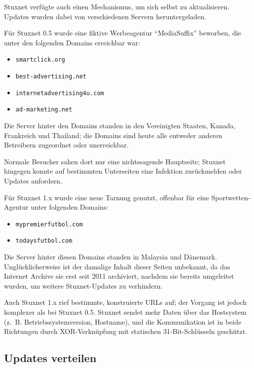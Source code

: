 \documentclass[a4paper]{article}
\begin{document}
Stuxnet verfügte auch einen Mechanismus, um sich selbst zu aktualisieren.
Updates wurden dabei von verschiedenen Servern heruntergeladen.

Für Stuxnet 0.5 wurde eine fiktive Werbeagentur ``MediaSuffix'' beworben, die unter den folgenden Domains erreichbar war:

\begin{itemize}
\item \texttt{smartclick.org}
\item \texttt{best-advertising.net}
\item \texttt{internetadvertising4u.com}
\item \texttt{ad-marketing.net}
\end{itemize}

Die Server hinter den Domains standen in den Vereinigten Staaten, Kanada, Frankreich und Thailand; %
die Domains sind heute alle entweder anderen Betreibern zugeordnet oder unerreichbar.

Normale Besucher sahen dort nur eine nichtssagende Hauptseite\cite{archive_best_advertising};
Stuxnet hingegen konnte auf bestimmten Unterseiten eine Infektion zurückmelden oder Updates anfordern.

Für Stuxnet 1.x wurde eine neue Tarnung genutzt, offenbar für eine Sport\-wet\-ten-Agentur unter folgenden Domains:

\begin{itemize}
\item \texttt{mypremierfutbol.com}
\item \texttt{todaysfutbol.com}
\end{itemize}

Die Server hinter diesen Domains standen in Malaysia und Dänemark.
Un\-glück\-li\-cher\-wei\-se ist der damalige Inhalt dieser Seiten unbekannt,
da das Internet Archive sie erst seit 2011 archiviert,
nachdem sie bereits umgeleitet wurden, um weitere Stuxnet-Updates zu verhindern.

Auch Stuxnet 1.x rief bestimmte, konstruierte URLs auf;
der Vorgang ist jedoch komplexer als bei Stuxnet 0.5.
Stuxnet sendet mehr Daten über das Hostsystem (z.~B. Betriebssystemversion, Hostname),
und die Kommunikation ist in beide Richtungen durch XOR-Verknüpfung mit statischen 31-Bit-Schlüsseln geschützt.

\subsection{Updates verteilen}
\end{document}
